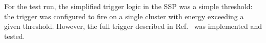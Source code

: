 
For the test run, the simplified trigger logic in the SSP was a simple threshold: the trigger was configured 
to fire on a single cluster with energy exceeding a given threshold. However, the full trigger described in 
Ref.~\cite{HPS_tPROP} was implemented and tested.
